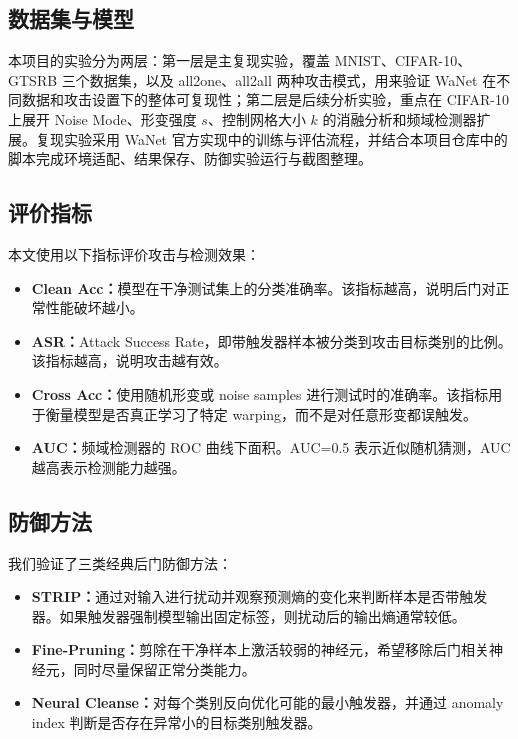 \documentclass[UTF8,zihao=-4]{ctexart}
\begin{document}
\subsection{数据集与模型}

本项目的实验分为两层：第一层是主复现实验，覆盖 MNIST、CIFAR-10、GTSRB 三个数据集，以及 all2one、all2all 两种攻击模式，用来验证 WaNet 在不同数据和攻击设置下的整体可复现性；第二层是后续分析实验，重点在 CIFAR-10 上展开 Noise Mode、形变强度 $s$、控制网格大小 $k$ 的消融分析和频域检测器扩展。复现实验采用 WaNet 官方实现中的训练与评估流程，并结合本项目仓库中的脚本完成环境适配、结果保存、防御实验运行与截图整理。

\subsection{评价指标}

本文使用以下指标评价攻击与检测效果：
\begin{itemize}
    \item \textbf{Clean Acc：}模型在干净测试集上的分类准确率。该指标越高，说明后门对正常性能破坏越小。
    \item \textbf{ASR：}Attack Success Rate，即带触发器样本被分类到攻击目标类别的比例。该指标越高，说明攻击越有效。
    \item \textbf{Cross Acc：}使用随机形变或 noise samples 进行测试时的准确率。该指标用于衡量模型是否真正学习了特定 warping，而不是对任意形变都误触发。
    \item \textbf{AUC：}频域检测器的 ROC 曲线下面积。AUC=0.5 表示近似随机猜测，AUC 越高表示检测能力越强。
\end{itemize}

\subsection{防御方法}

我们验证了三类经典后门防御方法：
\begin{itemize}
    \item \textbf{STRIP：}通过对输入进行扰动并观察预测熵的变化来判断样本是否带触发器。如果触发器强制模型输出固定标签，则扰动后的输出熵通常较低。
    \item \textbf{Fine-Pruning：}剪除在干净样本上激活较弱的神经元，希望移除后门相关神经元，同时尽量保留正常分类能力。
    \item \textbf{Neural Cleanse：}对每个类别反向优化可能的最小触发器，并通过 anomaly index 判断是否存在异常小的目标类别触发器。
\end{itemize}
\end{document}
